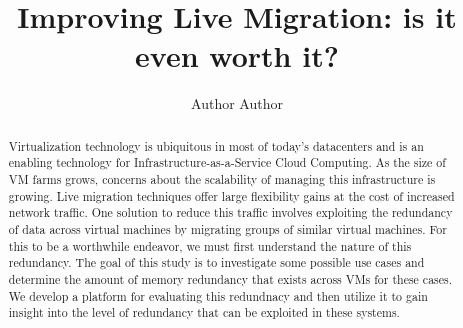 \documentclass{acm_proc_article-sp}
\begin{document}
\title{Improving Live Migration: is it even worth it?}
%
%
%
%

%
\author{
%
%
\alignauthor
Author
\alignauthor
Author
}

\maketitle
\begin{abstract}
Virtualization technology is ubiquitous in most of today's datacenters and is an enabling technology for Infrastructure-as-a-Service Cloud Computing.  As the size of VM farms grows, concerns about the scalability of managing this infrastructure is growing.  Live migration techniques offer large flexibility gains at the cost of increased network traffic.  One solution to reduce this traffic involves exploiting the redundancy of data across virtual machines by migrating groups of similar virtual machines.  For this to be a worthwhile endeavor, we must first understand the nature of this redundancy.  The goal of this study is to investigate some possible use cases and determine the amount of memory redundancy that exists across VMs for these cases.  We develop a platform for evaluating this redundnacy and then utilize it to gain insight into the level of redundancy that can be exploited in these systems.
\end{abstract}
\end{document}
